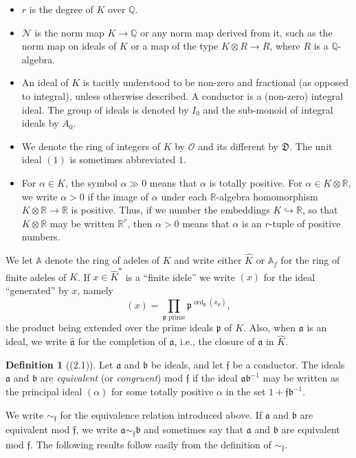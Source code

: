 \documentclass[12pt,a4paper]{article}
\theoremstyle{plain}
\theoremstyle{definition}
\newtheorem{definition}[theorem]{Definition}
\newcommand{\OO}{\mathcal{O}}
\newcommand{\DD}{\mathfrak{D}}
\newcommand{\ff}{\mathfrak{f}}
\newcommand{\pp}{\mathfrak{p}}
\DeclareMathOperator{\ord}{ord}
\newcommand{\Q}{\mathbb{Q}}
\newcommand{\R}{\mathbb{R}}
\newcommand{\A}{\mathbb{A}}
\begin{document}
\begin{itemize}[leftmargin=2em]
\item $r$ is the degree of $K$ over $\Q$.
\item $\mathcal{N}$ is the norm map $K\to\Q$ or any norm map derived from it, such as the norm map on ideals of $K$ or a map of the type $K\otimes R\to R$, where $R$ is a $\Q$-algebra.
\item An ideal of $K$ is tacitly understood to be non-zero and fractional (as opposed to integral), unless otherwise described. A conductor is a (non-zero) integral ideal. The group of ideals is denoted by $I_0$ and the sub-monoid of integral ideals by $A_0$.
\item We denote the ring of integers of $K$ by $\OO$ and its different by $\DD$. The unit ideal $(1)$ is sometimes abbreviated $1$.
\item For $\alpha\in K$, the symbol $\alpha\gg0$ means that $\alpha$ is totally positive. For $\alpha\in K\otimes\R$, we write $\alpha>0$ if the image of $\alpha$ under each $\R$-algebra homomorphism $K\otimes\R\to\R$ is positive. Thus, if we number the embeddings $K\hookrightarrow\R$, so that $K\otimes\R$ may be written $\R^r$, then $\alpha>0$ means that $\alpha$ is an $r$-tuple of positive numbers.
\end{itemize}

We let $\A$ denote the ring of adeles of $K$ and write either $\hat{K}$ or $\A_f$ for the ring of finite adeles of $K$. If $x\in\hat{K}^*$ is a ``finite idele'' we write $(x)$ for the ideal ``generated'' by $x$, namely
\[
(x)=\prod_{\pp\text{ prime}}\pp^{\ord_{\pp}(x_{\pp})},
\]
the product being extended over the prime ideals $\pp$ of $K$. Also, when $\mathfrak{a}$ is an ideal, we write $\hat{\mathfrak{a}}$ for the completion of $\mathfrak{a}$, i.e., the closure of $\mathfrak{a}$ in $\hat{K}$.

\begin{definition}[(2.1)]\label{def:equiv}
Let $\mathfrak{a}$ and $\mathfrak{b}$ be ideals, and let $\ff$ be a conductor. The ideals $\mathfrak{a}$ and $\mathfrak{b}$ are \textit{equivalent} (or \textit{congruent}) mod $\ff$ if the ideal $\mathfrak{a}\mathfrak{b}^{-1}$ may be written as the principal ideal $(\alpha)$ for some totally positive $\alpha$ in the set $1+\ff\mathfrak{b}^{-1}$.
\end{definition}

We write $\sim_{\ff}$ for the equivalence relation introduced above. If $\mathfrak{a}$ and $\mathfrak{b}$ are equivalent mod $\ff$, we write $\mathfrak{a}\sim_{\ff}\mathfrak{b}$ and sometimes say that $\mathfrak{a}$ and $\mathfrak{b}$ are equivalent mod $\ff$. The following results follow easily from the definition of $\sim_{\ff}$.
\end{document}
